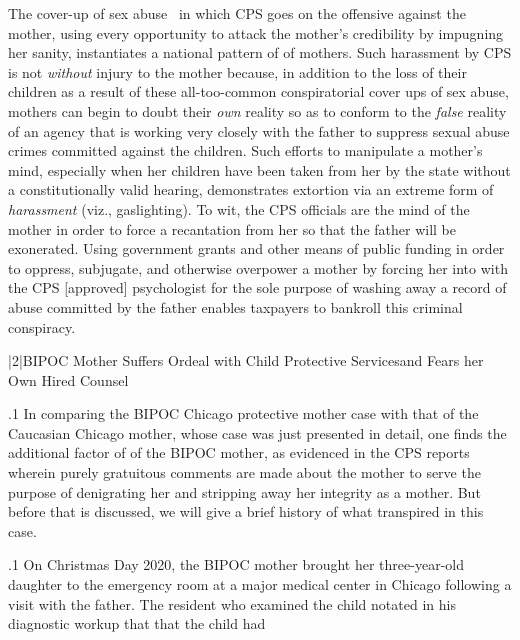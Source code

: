 \documentclass[11pt, twoside]{article}
\begin{document}
{{\begin{blockQuote}
The cover-up of sex abuse \ellThree{2pt}{2pt}\ in which CPS goes on the offensive
against the mother, using every opportunity to attack the mother's
credibility by impugning her sanity, instantiates a national pattern
of  of mothers. Such harassment by CPS is not \textit{without}
injury to the mother because, in addition to the loss of their children as a result of these all-too-common conspiratorial cover ups
of sex abuse, mothers can begin to doubt their \textit{own} reality so as to
conform to the \textit{false} reality of an agency that is working very closely
with the father to suppress sexual abuse crimes committed against
the children. Such efforts to manipulate a mother's mind, especially
when her children have been taken from her by the state without a constitutionally valid hearing, demonstrates extortion via an
extreme form of \textit{harassment} (viz., gaslighting). To wit, the CPS officials are  the mind of the mother in order to force
a recantation from her so that the father will be exonerated. Using
government grants and other means of public funding in order to
oppress, subjugate, and otherwise overpower a mother by forcing
her into  with the CPS [approved] psychologist for the
sole purpose of washing away a record of abuse committed by the
father enables taxpayers to bankroll this criminal conspiracy.
\end{blockQuote}

}%


\s|2|{BIPOC Mother Suffers Ordeal with Child Protective Services\mdash{}and Fears her Own Hired Counsel}

\p.1{%
\noindent{}In comparing the BIPOC Chicago protective mother case with that of
the Caucasian Chicago mother, whose case was just presented in detail, one finds the additional factor of  of the BIPOC mother,
as evidenced in the CPS reports wherein purely gratuitous comments
are made about the mother to serve the purpose of denigrating her and
stripping away her integrity as a mother. But before that is discussed, we
will give a brief history of what transpired in this case.
}%

\p.1{%
On Christmas Day 2020, the BIPOC mother brought her
three-year-old daughter to the emergency room at a major medical center in
Chicago following a visit with the father. The resident who examined the
child notated in his diagnostic workup that that the child had 
}%

}
\end{document}
